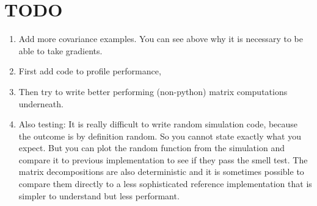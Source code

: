 \section{TODO}

\begin{enumerate}
	\item Add more covariance examples. You can see above why it is necessary to
	be able to take gradients.
	\item First add code to profile performance,
	\item Then try to write better performing (non-python) matrix computations underneath.
	\item Also testing: It is really difficult to write random simulation code,
	because the outcome is by definition random. So you cannot state exactly what you
	expect. But you can plot the random function from the simulation and
	compare it to previous implementation to see if they pass the smell test.
	The matrix decompositions are also deterministic and it is sometimes possible
	to compare them directly to a less sophisticated reference implementation
	that is simpler to understand but less performant.
\end{enumerate}

